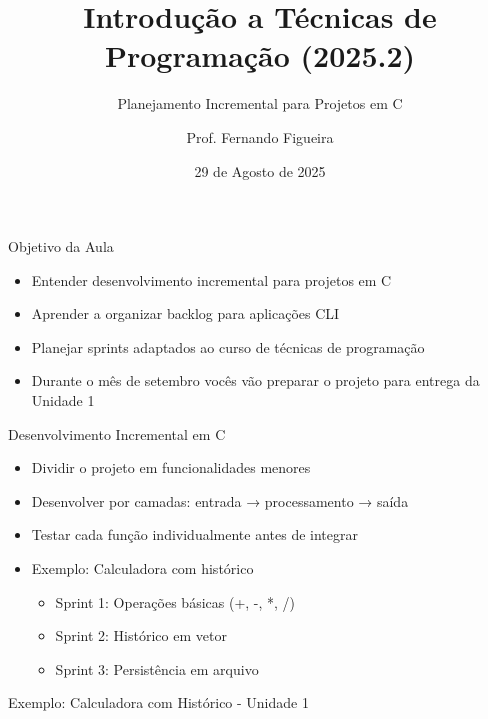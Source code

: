 \documentclass[10pt]{beamer}
\title{Introdução a Técnicas de Programação (2025.2)}
\subtitle{Planejamento Incremental para Projetos em C}
\author{Prof. Fernando Figueira}
\institute{DIMAp - UFRN}
\date{29 de Agosto de 2025}
\begin{document}
\frame{\titlepage}

\begin{frame}{Objetivo da Aula}
\begin{itemize}
    \item Entender desenvolvimento incremental para projetos em C
    \item Aprender a organizar backlog para aplicações CLI
    \item Planejar sprints adaptados ao curso de técnicas de programação
    \item Durante o mês de setembro vocês vão preparar o projeto para entrega da Unidade 1
\end{itemize}
\end{frame}

\begin{frame}{Desenvolvimento Incremental em C}
\begin{itemize}
    \item Dividir o projeto em funcionalidades menores
    \item Desenvolver por camadas: entrada → processamento → saída
    \item Testar cada função individualmente antes de integrar
    \item Exemplo: Calculadora com histórico
    \begin{itemize}
        \item Sprint 1: Operações básicas (+, -, *, /)
        \item Sprint 2: Histórico em vetor
        \item Sprint 3: Persistência em arquivo
    \end{itemize}
\end{itemize}
\end{frame}

\begin{frame}{Exemplo: Calculadora com Histórico - Unidade 1}
\centering
{}
\end{frame}
\end{document}

